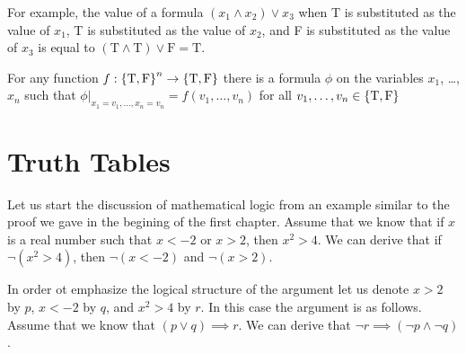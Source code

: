 For example, the value of a formula $(x_1 \land x_2) \lor x_3$ when T is
substituted as the value of $x_1$, T is substituted as the value of $x_2$,
and F is substituted as the value of $x_3$ is equal to
$(\text{T} \land \text{T}) \lor \text{F} = \text{T}$.

\begin{theorem}
  For any function $f : \set{\text{T}, \text{F}}^n \to
  \set{\text{T}, \text{F}}$ there is a
  formula $\phi$ on the variables $x_1$, \dots, $x_n$ such that
  $\phi\big\rvert_{x_1 = v_1, \dots, x_n = v_n} = f(v_1, \dots, v_n)$ for all
  $v_1, \dots, v_n \in \set{\text{T}, \text{F}}$
\end{theorem}

\section{Truth Tables}


Let us start the discussion of mathematical logic from an example similar to
the proof we gave in the begining of the first chapter. Assume that we know
that if $x$ is a real number such that $x < -2$ or $x > 2$, then $x^2 > 4$. We
can derive that if $\lnot (x^2 > 4)$, then $\lnot (x < -2)$ and $\lnot (x > 2)$.

In order ot emphasize the logical structure of the argument let us denote
$x > 2$ by $p$, $x < -2$ by $q$, and $x^2 > 4$ by $r$. In this case the
argument is as follows. Assume that we know that $(p \lor q) \implies r$. We
can derive that $\lnot r \implies (\lnot p \land \lnot q)$.

